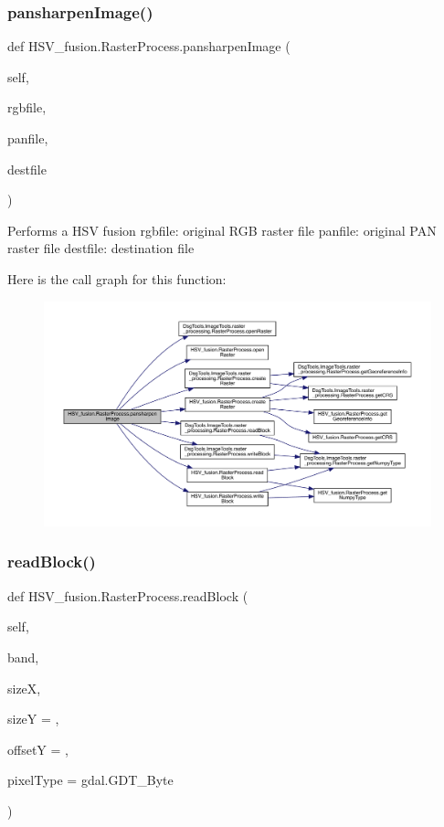\subsubsection{\texorpdfstring{pansharpen\+Image()}{pansharpenImage()}}
{\footnotesize\ttfamily def H\+S\+V\+\_\+fusion.\+Raster\+Process.\+pansharpen\+Image (\begin{DoxyParamCaption}\item[{}]{self,  }\item[{}]{rgbfile,  }\item[{}]{panfile,  }\item[{}]{destfile }\end{DoxyParamCaption})}

\begin{DoxyVerb}Performs a HSV fusion
rgbfile: original RGB raster file
panfile: original PAN raster file
destfile: destination file
\end{DoxyVerb}
 Here is the call graph for this function\+:
\nopagebreak
\begin{figure}[H]
\begin{center}
\leavevmode
\includegraphics[width=350pt]{class_h_s_v__fusion_1_1_raster_process_aca76f020e0abc7e7985a82381f989d9a_cgraph}
\end{center}
\end{figure}
\mbox{\label{class_h_s_v__fusion_1_1_raster_process_a1c123d5883dc2c2783391cdb7ebfe738}} 
\subsubsection{\texorpdfstring{read\+Block()}{readBlock()}}
{\footnotesize\ttfamily def H\+S\+V\+\_\+fusion.\+Raster\+Process.\+read\+Block (\begin{DoxyParamCaption}\item[{}]{self,  }\item[{}]{band,  }\item[{}]{sizeX,  }\item[{}]{sizeY = {},  }\item[{}]{offsetY = {},  }\item[{}]{pixel\+Type = {\ttfamily gdal.GDT\+\_\+Byte} }\end{DoxyParamCaption})}

